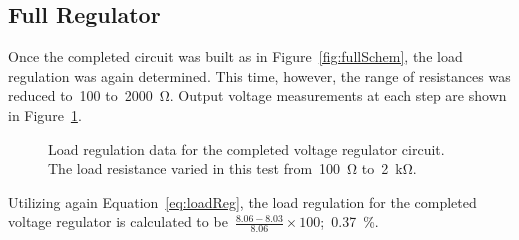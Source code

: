 \subsection{Full Regulator}
Once the completed circuit was built as in Figure~\ref{fig:fullSchem}, the load
regulation was again determined.  This time, however, the range of resistances
was reduced to~100 to~\SI{2000}{\ohm}.  Output voltage measurements at each step are shown in Figure~\ref{fig:fullLoadReg}.
%
\begin{figure}[H]
	\centering
	
	\parbox{4.25in}{
	\caption[Plot --- Load regulation of combined circuit]{Load regulation data
	for the completed voltage regulator circuit.  The load resistance varied in
	this test from~\SI{100}{\ohm} to~\SI{2}{\kilo\ohm}.}
	\label{fig:fullLoadReg}
	}
\end{figure}
%
Utilizing again Equation~\eqref{eq:loadReg}, the load regulation for the
completed voltage regulator is calculated to be~$\frac{8.06-8.03}{8.06} \times
100$;~\SI{0.37}{\percent}.
